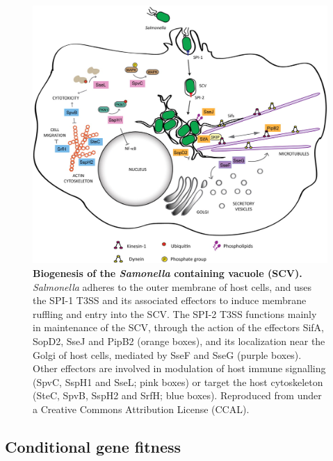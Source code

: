 \begin{figure}[htp]
\begin{center}
\includegraphics[width=14cm]{SCV.jpg}
\caption[Biogenesis of the \textit{Samonella} containing vacuole]{\textbf{Biogenesis of the \textit{Samonella} containing vacuole (SCV).} \textit{Salmonella} adheres to the outer membrane of host cells, and uses the SPI-1 T3SS and its associated effectors to induce membrane ruffling and entry into the SCV. The SPI-2 T3SS functions mainly in maintenance of the SCV, through the action of the effectors SifA, SopD2, SseJ and PipB2 (orange boxes), and its localization near the Golgi of host cells, mediated by SseF and SseG (purple boxes). Other effectors are involved in modulation of host immune signalling (SpvC, SspH1 and SseL; pink boxes) or target the host cytoskeleton (SteC, SpvB, SspH2 and SrfH; blue boxes). Reproduced from \textcite{Figueira2012} under a Creative Commons Attribution License (CCAL). 
} 
\label{fig:SCV}
\end{center}
\end{figure}

\subsection{Conditional gene fitness}

